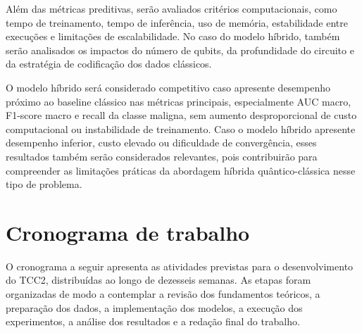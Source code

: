 \documentclass[
    12pt,
    openright,
    oneside,
    a4paper,
    english,
    brazil
]{abntex2}
\begin{document}
Além das métricas preditivas, serão avaliados critérios computacionais, como tempo de treinamento, tempo de inferência, uso de memória, estabilidade entre execuções e limitações de escalabilidade. No caso do modelo híbrido, também serão analisados os impactos do número de qubits, da profundidade do circuito e da estratégia de codificação dos dados clássicos.

O modelo híbrido será considerado competitivo caso apresente desempenho próximo ao baseline clássico nas métricas principais, especialmente AUC macro, F1-score macro e recall da classe maligna, sem aumento desproporcional de custo computacional ou instabilidade de treinamento. Caso o modelo híbrido apresente desempenho inferior, custo elevado ou dificuldade de convergência, esses resultados também serão considerados relevantes, pois contribuirão para compreender as limitações práticas da abordagem híbrida quântico-clássica nesse tipo de problema.

\section{Cronograma de trabalho}
\label{sec:cronograma}

O cronograma a seguir apresenta as atividades previstas para o desenvolvimento do TCC2, distribuídas ao longo de dezesseis semanas. As etapas foram organizadas de modo a contemplar a revisão dos fundamentos teóricos, a preparação dos dados, a implementação dos modelos, a execução dos experimentos, a análise dos resultados e a redação final do trabalho.
\end{document}
